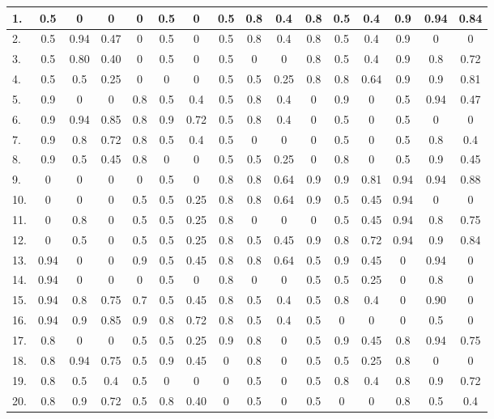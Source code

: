 \documentclass[a4paper,openany]{book}
\begin{document}
\begin{center}
\begin{landscape}
\begin{longtable}[c]{|l|c|c|c|c|c|c|c|c|c|c|c|c|c|c|c|}
							1. & 0.5 & 0 & 0 & 0 & 0.5 & 0 & 0.5 & 0.8 & 0.4 & 0.8 & 0.5 & 0.4 & 0.9 & 0.94 & 0.84 \\
							\hline
							2. & 0.5 & 0.94 & 0.47 & 0 & 0.5 & 0  & 0.5 & 0.8 & 0.4 & 0.8 & 0.5 & 0.4 & 0.9 & 0 & 0\\
							\hline
							3. & 0.5 & 0.80 & 0.40 & 0 & 0.5 & 0 & 0.5 & 0 & 0 & 0.8 & 0.5 & 0.4 & 0.9 & 0.8 & 0.72 \\
							\hline
							4. & 0.5 & 0.5 & 0.25 & 0 & 0 & 0& 0.5 & 0.5 & 0.25 & 0.8 & 0.8 & 0.64 & 0.9 & 0.9 & 0.81 \\
							\hline
							5. & 0.9 & 0 & 0 & 0.8 & 0.5 & 0.4 & 0.5 & 0.8 & 0.4 & 0 & 0.9 & 0 & 0.5 & 0.94 & 0.47 \\
							\hline
							6. & 0.9 & 0.94 & 0.85 & 0.8 & 0.9 & 0.72 & 0.5 & 0.8 & 0.4 & 0 & 0.5 & 0 & 0.5 & 0 & 0  \\
							\hline
							7. & 0.9 & 0.8 & 0.72 & 0.8 & 0.5 & 0.4 & 0.5 & 0 & 0 & 0 & 0.5 & 0 & 0.5 & 0.8 & 0.4 \\
							\hline
							8. & 0.9 & 0.5 & 0.45 & 0.8 & 0 & 0 & 0.5 & 0.5 & 0.25 & 0 & 0.8 & 0 & 0.5 & 0.9 & 0.45  \\
							\hline
							9. & 0 & 0 & 0 & 0 & 0.5 & 0 & 0.8 & 0.8 & 0.64 & 0.9 & 0.9 & 0.81 & 0.94 & 0.94 & 0.88  \\
							\hline
							10. & 0 & 0 & 0 & 0.5 & 0.5 & 0.25 & 0.8 & 0.8 & 0.64 & 0.9 & 0.5 & 0.45 & 0.94 & 0 & 0  \\
							\hline
							11. & 0 & 0.8 & 0 & 0.5 & 0.5 & 0.25 & 0.8 & 0 & 0 & 0 & 0.5 & 0.45 & 0.94 & 0.8 & 0.75  \\
							\hline
							12. & 0 & 0.5 & 0 & 0.5 & 0.5 & 0.25 & 0.8 & 0.5 & 0.45 & 0.9 & 0.8 & 0.72 & 0.94 & 0.9 & 0.84  \\
							\hline
							13. & 0.94 & 0 & 0 & 0.9 & 0.5 & 0.45 & 0.8 & 0.8 & 0.64 & 0.5 & 0.9 & 0.45 & 0 & 0.94 & 0 \\
							\hline
							14. & 0.94 & 0 & 0 & 0 & 0.5 & 0  & 0.8 & 0 & 0 & 0.5 & 0.5 & 0.25 & 0 & 0.8 & 0  \\
							\hline
							15. & 0.94 & 0.8 & 0.75 & 0.7 & 0.5 & 0.45 & 0.8 & 0.5 & 0.4 & 0.5 & 0.8 & 0.4 & 0 & 0.90 & 0  \\
							\hline
							16. & 0.94 & 0.9 & 0.85 & 0.9 & 0.8 & 0.72 & 0.8 & 0.5 & 0.4 & 0.5 & 0 & 0 & 0 & 0.5 & 0  \\
							\hline
							17. & 0.8 & 0 & 0 & 0.5 & 0.5 & 0.25 & 0.9 & 0.8 & 0 & 0.5 & 0.9 & 0.45 & 0.8 & 0.94 & 0.75  \\
							\hline
							18. & 0.8 & 0.94 & 0.75 & 0.5 & 0.9 & 0.45 & 0 & 0.8 & 0 & 0.5 & 0.5 & 0.25 & 0.8 & 0 & 0  \\
							\hline
							19. & 0.8 & 0.5 & 0.4 & 0.5 & 0 & 0 & 0 & 0.5 & 0 & 0.5 & 0.8 & 0.4 & 0.8 & 0.9 & 0.72  \\
							\hline
							20. & 0.8 & 0.9 & 0.72 & 0.5 & 0.8 & 0.40 & 0 & 0.5 & 0 & 0.5 & 0 & 0 & 0.8 & 0.5 & 0.4  \\
							\hline
						\end{longtable}
					\end{landscape}
				\end{center}
\end{document}
